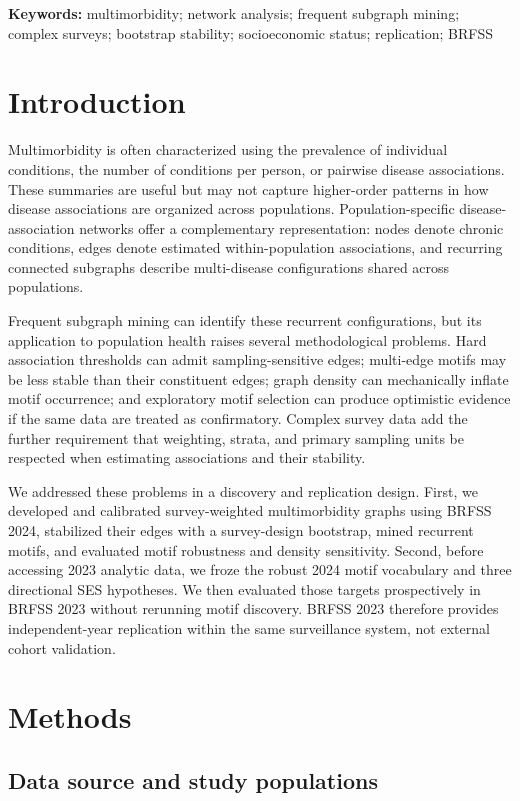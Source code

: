 \documentclass[11pt]{article}
\newcommand{\brfss}{\textsc{BRFSS}}
\begin{document}
\noindent\textbf{Keywords:}
multimorbidity; network analysis; frequent subgraph mining; complex surveys;
bootstrap stability; socioeconomic status; replication; BRFSS

\section{Introduction}

Multimorbidity is often characterized using the prevalence of individual
conditions, the number of conditions per person, or pairwise disease
associations. These summaries are useful but may not capture higher-order
patterns in how disease associations are organized across populations.
Population-specific disease-association networks offer a complementary
representation: nodes denote chronic conditions, edges denote estimated
within-population associations, and recurring connected subgraphs describe
multi-disease configurations shared across populations.

Frequent subgraph mining can identify these recurrent configurations, but its
application to population health raises several methodological problems.
Hard association thresholds can admit sampling-sensitive edges; multi-edge
motifs may be less stable than their constituent edges; graph density can
mechanically inflate motif occurrence; and exploratory motif selection can
produce optimistic evidence if the same data are treated as confirmatory.
Complex survey data add the further requirement that weighting, strata, and
primary sampling units be respected when estimating associations and their
stability.

We addressed these problems in a discovery and replication design. First, we
developed and calibrated survey-weighted multimorbidity graphs using
\brfss{} 2024, stabilized their edges with a survey-design bootstrap, mined
recurrent motifs, and evaluated motif robustness and density sensitivity.
Second, before accessing 2023 analytic data, we froze the robust 2024 motif
vocabulary and three directional SES hypotheses. We then evaluated those
targets prospectively in \brfss{} 2023 without rerunning motif discovery.
\brfss{} 2023 therefore provides independent-year replication within the same
surveillance system, not external cohort validation.

\section{Methods}

\subsection{Data source and study populations}
\end{document}
